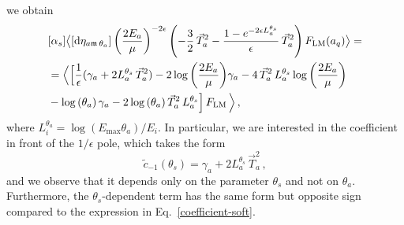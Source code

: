 \documentclass[a4paper, 12pt]{book}
\newcommand{\um}{\mathfrak{m}}
\begin{document}
we obtain
\begin{equation}
  \begin{aligned}
    & [\alpha_s]\bigl < [\mathrm{d}\eta_{a\um \, \theta_a}] \left(\frac{2E_a}{\mu}\right)^{-2\epsilon} \left(-\frac{3}{2} \, \vec{T}_a^2-\frac{1-e^{-2\epsilon L_a^{\theta_s}}}{\epsilon}\, \vec{T}_a^2 \right) F_{\mathrm{LM}}(a_q) \bigr> = \\
    & = \Bigl< \Bigl[ \frac{1}{\epsilon}(\gamma_a +  2 L_a^{\theta_s} \,\vec{T}_a^2) - 2 \log{\left(\frac{2E_a}{\mu}\right)}\gamma_a - 4 \, \vec{T}_a^2 \, L_a^{\theta_s} \log{\left(\frac{2E_a}{\mu}\right)} \\
    & - \log{(\theta_a)} \, \gamma_a - 2 \log{(\theta_a)} \, \vec{T}_a^2 \, L_a^{\theta_s}  \Bigr] \, F_{\mathrm{LM}} \, \Bigr > \, ,
  \end{aligned}
\end{equation}
where $L_i^{\theta_a}= \log{(E_{\mathrm{max}}\theta_a)/E_i}$. In particular, we are interested in the coefficient in front of the $1/\epsilon$ pole, which takes the form
\begin{equation}
    \tilde{c}_{-1}(\theta_s)= \gamma_a + 2 L_a^{\theta_s} \,\vec{T}_a^2 \, ,
    \label{coefficient-collinear-initial}
\end{equation}
and we observe that it depends only on the parameter $\theta_s$ and not on $\theta_a$. Furthermore, the $\theta_s$-dependent term has the same form but opposite sign compared to the expression in Eq.~\ref{coefficient-soft}.
\end{document}
